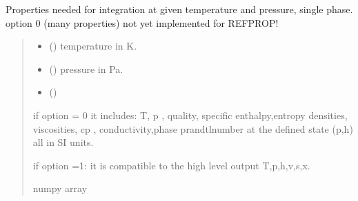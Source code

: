 \documentclass[letterpaper,10pt,english]{sphinxmanual}
\begin{document}
\begin{fulllineitems}
\label{\detokenize{fluid_properties_rp:fluid_properties_rp.tp}}
\pysigstartsignatures
{}
\pysigstopsignatures
\sphinxAtStartPar
Properties needed for integration at given temperature and pressure,
single phase.
option 0 (many properties) not yet implemented for REFPROP!
\begin{quote}\begin{description}
\begin{itemize}
\item {} 
\sphinxAtStartPar
{} () \textendash{} temperature in K.

\item {} 
\sphinxAtStartPar
{} () \textendash{} pressure in Pa.

\item {} 
\sphinxAtStartPar
{} () \textendash{} 

\end{itemize}

\sphinxAtStartPar

\sphinxAtStartPar
{} \textendash{} if option = 0 it includes: T, p , quality, specific enthalpy,entropy
densities,
viscosities, cp , conductivity,phase prandtl\sphinxhyphen{}number
at the defined state (p,h)
all in SI units.

\sphinxAtStartPar
if option =1: it is compatible to the high level output
T,p,h,v,s,x.


\sphinxAtStartPar
numpy array

\end{description}\end{quote}

\end{fulllineitems}
\end{document}
